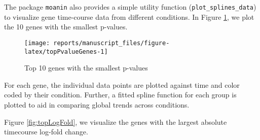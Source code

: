 \documentclass[9pt,a4paper,]{extarticle}
\newenvironment{Shaded}{\begin{snugshade}}{\end{snugshade}}
\newcommand{\DataTypeTok}[1]{\textcolor[rgb]{0.13,0.29,0.53}{#1}}
\newcommand{\DecValTok}[1]{\textcolor[rgb]{0.00,0.00,0.81}{#1}}
\newcommand{\FloatTok}[1]{\textcolor[rgb]{0.00,0.00,0.81}{#1}}
\newcommand{\KeywordTok}[1]{\textcolor[rgb]{0.13,0.29,0.53}{\textbf{#1}}}
\newcommand{\NormalTok}[1]{#1}
\newcommand{\OperatorTok}[1]{\textcolor[rgb]{0.81,0.36,0.00}{\textbf{#1}}}
\newcommand{\OtherTok}[1]{\textcolor[rgb]{0.56,0.35,0.01}{#1}}
\newcommand{\StringTok}[1]{\textcolor[rgb]{0.31,0.60,0.02}{#1}}
\begin{document}
The package \texttt{moanin} also provides a simple utility function (\texttt{plot\_splines\_data}) to
visualize gene time-course data from different conditions. In Figure \ref{fig:topPvalueGenes}, we plot the 10
genes with the smallest p-values.

\begin{Shaded}
\end{Shaded}

\begin{figure}[H]

{\centering \texttt{[image: reports/manuscript\_files/figure-latex/topPvalueGenes-1]} 

}

\caption{Top 10 genes with the smallest p-values}\label{fig:topPvalueGenes}
\end{figure}

For each gene, the individual data points are plotted against time and color coded by their condition. Further, a fitted spline function for each group is plotted to aid in comparing global trends across conditions.

Figure \ref{fig:topLogFold}, we visualize the genes with the largest absolute timecourse log-fold
change.

\begin{Shaded}
\end{Shaded}
\end{document}
